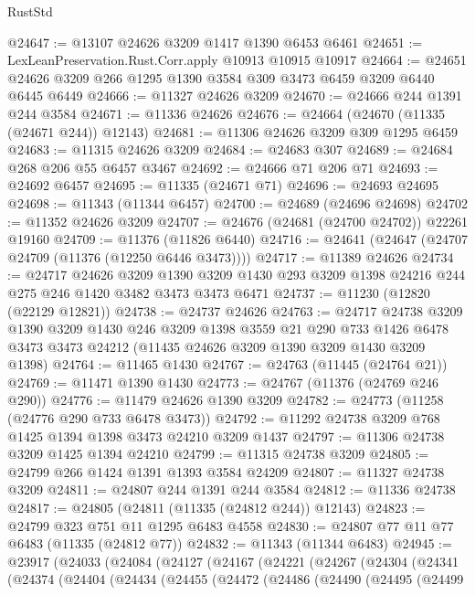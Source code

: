 \begin{lexlean}{RustStd}
\begin{coremodule}
{{{{{{{{{{{{{{{{{{{@24647 := @13107 @24626 @3209 @1417 @1390 @6453 @6461
@24651 := LexLeanPreservation.Rust.Corr.apply @10913 @10915 @10917
@24664 := @24651 @24626 @3209 @266 @1295 @1390 @3584 @309 @3473 @6459 @3209 @6440 @6445 @6449
@24666 := @11327 @24626 @3209
@24670 := @24666 @244 @1391 @244 @3584
@24671 := @11336 @24626
@24676 := @24664 (@24670 (@11335 (@24671 @244)) @12143)
@24681 := @11306 @24626 @3209 @309 @1295 @6459
@24683 := @11315 @24626 @3209
@24684 := @24683 @307
@24689 := @24684 @268 @206 @55 @6457 @3467
@24692 := @24666 @71 @206 @71
@24693 := @24692 @6457
@24695 := @11335 (@24671 @71)
@24696 := @24693 @24695
@24698 := @11343 (@11344 @6457)
@24700 := @24689 (@24696 @24698)
@24702 := @11352 @24626 @3209
@24707 := @24676 (@24681 (@24700 @24702)) @22261 @19160
@24709 := @11376 (@11826 @6440)
@24716 := @24641 (@24647 (@24707 @24709 (@11376 (@12250 @6446 @3473))))
@24717 := @11389 @24626
@24734 := @24717
    @24626
    @3209
    @1390
    @3209
    @1430
    @293
    @3209
    @1398
    @24216
    @244
    @275
    @246
    @1420
    @3482
    @3473
    @3473
    @6471
@24737 := @11230 (@12820 (@22129 @12821))
@24738 := @24737 @24626
@24763 := @24717
    @24738
    @3209
    @1390
    @3209
    @1430
    @246
    @3209
    @1398
    @3559
    @21
    @290
    @733
    @1426
    @6478
    @3473
    @3473
    @24212
    (@11435 @24626 @3209 @1390 @3209 @1430 @3209 @1398)
@24764 := @11465 @1430
@24767 := @24763 (@11445 (@24764 @21))
@24769 := @11471 @1390 @1430
@24773 := @24767 (@11376 (@24769 @246 @290))
@24776 := @11479 @24626 @1390 @3209
@24782 := @24773 (@11258 (@24776 @290 @733 @6478 @3473))
@24792 := @11292 @24738 @3209 @768 @1425 @1394 @1398 @3473 @24210 @3209 @1437
@24797 := @11306 @24738 @3209 @1425 @1394 @24210
@24799 := @11315 @24738 @3209
@24805 := @24799 @266 @1424 @1391 @1393 @3584 @24209
@24807 := @11327 @24738 @3209
@24811 := @24807 @244 @1391 @244 @3584
@24812 := @11336 @24738
@24817 := @24805 (@24811 (@11335 (@24812 @244)) @12143)
@24823 := @24799 @323 @751 @11 @1295 @6483 @4558
@24830 := @24807 @77 @11 @77 @6483 (@11335 (@24812 @77))
@24832 := @11343 (@11344 @6483)
@24945 := @23917
    (@24033
      (@24084
        (@24127
          (@24167
            (@24221
              (@24267
                (@24304
                  (@24341
                    (@24374
                      (@24404
                        (@24434
                          (@24455
                            (@24472
                              (@24486
                                (@24490
                                  (@24495
                                    (@24499
}}}}}}}}}}}}}}}}}}}
\end{coremodule}
\end{lexlean}
